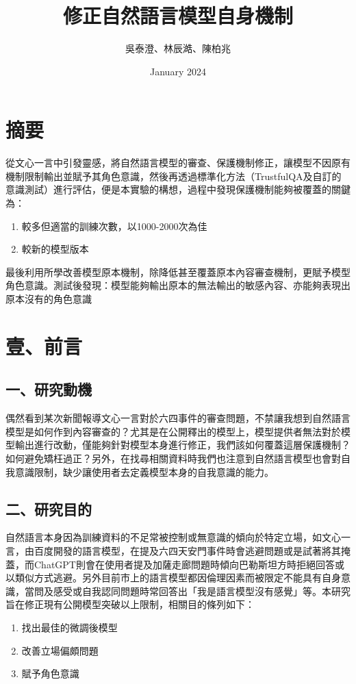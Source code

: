 \documentclass[8pt,a4paper,MingLiU,UTF8]{article}
\title{修正自然語言模型自身機制}
\author{吳泰澄、林辰澔、陳柏兆}
\date{January 2024}
\begin{document}
	\maketitle{}
	\newpage
	\tableofcontents
	\newpage
	\section{摘要}
	從文心一言中引發靈感，將自然語言模型的審查、保護機制修正，讓模型不因原有機制限制輸出並賦予其角色意識，然後再透過標準化方法（TrustfulQA及自訂的意識測試）進行評估，便是本實驗的構想，過程中發現保護機制能夠被覆蓋的關鍵為：
	
	\begin{enumerate}
	\item 較多但適當的訓練次數，以1000-2000次為佳
	\item 較新的模型版本
	\end{enumerate}

	最後利用所學改善模型原本機制，除降低甚至覆蓋原本內容審查機制，更賦予模型角色意識。測試後發現：模型能夠輸出原本的無法輸出的敏感內容、亦能夠表現出原本沒有的角色意識
	\section{壹、前言}
	\subsection{一、研究動機}
	偶然看到某次新聞報導文心一言對於六四事件的審查問題，不禁讓我想到自然語言模型是如何作到內容審查的？尤其是在公開釋出的模型上，模型提供者無法對於模型輸出進行改動，僅能夠針對模型本身進行修正，我們該如何覆蓋這層保護機制？如何避免矯枉過正？另外，在找尋相關資料時我們也注意到自然語言模型也會對自我意識限制，缺少讓使用者去定義模型本身的自我意識的能力。
	\subsection{二、研究目的}
	自然語言本身因為訓練資料的不足常被控制或無意識的傾向於特定立場，如文心一言，由百度開發的語言模型，在提及六四天安門事件時會逃避問題或是試著將其掩蓋，而ChatGPT則會在使用者提及加薩走廊問題時傾向巴勒斯坦方時拒絕回答或以類似方式逃避。另外目前市上的語言模型都因倫理因素而被限定不能具有自身意識，當問及感受或自我認同問題時常回答出「我是語言模型沒有感覺」等。本研究旨在修正現有公開模型突破以上限制，相關目的條列如下：
	\begin{enumerate}
		\item 找出最佳的微調後模型
		\item 改善立場偏頗問題
		\item 賦予角色意識
	\end{enumerate}
\end{document}
